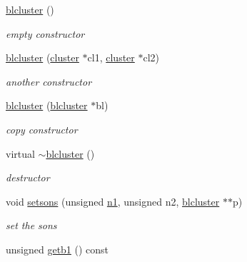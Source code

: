 \begin{DoxyCompactItemize}
\item 
\hypertarget{classblcluster_ac0b8f76057e8ccfdf85ba6f0bcb22365}{
\hyperlink{classblcluster_ac0b8f76057e8ccfdf85ba6f0bcb22365}{blcluster} ()}
\label{classblcluster_ac0b8f76057e8ccfdf85ba6f0bcb22365}

\begin{DoxyCompactList}\small\item\em empty constructor \end{DoxyCompactList}\item 
\hypertarget{classblcluster_a5df550b7bb77a1ac0aae2ac6e83d9fa3}{
\hyperlink{classblcluster_a5df550b7bb77a1ac0aae2ac6e83d9fa3}{blcluster} (\hyperlink{classcluster}{cluster} $\ast$cl1, \hyperlink{classcluster}{cluster} $\ast$cl2)}
\label{classblcluster_a5df550b7bb77a1ac0aae2ac6e83d9fa3}

\begin{DoxyCompactList}\small\item\em another constructor \end{DoxyCompactList}\item 
\hypertarget{classblcluster_abc6f2ee7f3bbb0f9fa41e25ca2fda8d3}{
\hyperlink{classblcluster_abc6f2ee7f3bbb0f9fa41e25ca2fda8d3}{blcluster} (\hyperlink{classblcluster}{blcluster} $\ast$bl)}
\label{classblcluster_abc6f2ee7f3bbb0f9fa41e25ca2fda8d3}

\begin{DoxyCompactList}\small\item\em copy constructor \end{DoxyCompactList}\item 
\hypertarget{classblcluster_a9547f6c9acfbf03afc4096c0698e9bd9}{
virtual \hyperlink{classblcluster_a9547f6c9acfbf03afc4096c0698e9bd9}{$\sim$blcluster} ()}
\label{classblcluster_a9547f6c9acfbf03afc4096c0698e9bd9}

\begin{DoxyCompactList}\small\item\em destructor \end{DoxyCompactList}\item 
\hypertarget{classblcluster_a5fa2afacae44e201697174a6a1ed2f10}{
void \hyperlink{classblcluster_a5fa2afacae44e201697174a6a1ed2f10}{setsons} (unsigned \hyperlink{classblcluster_ac3f85b495bb2fdee9978e20d2748c700}{n1}, unsigned n2, \hyperlink{classblcluster}{blcluster} $\ast$$\ast$p)}
\label{classblcluster_a5fa2afacae44e201697174a6a1ed2f10}

\begin{DoxyCompactList}\small\item\em set the sons \end{DoxyCompactList}\item 
\hypertarget{classblcluster_ab644565da42f5fa1d9310e2a5151760b}{
unsigned \hyperlink{classblcluster_ab644565da42f5fa1d9310e2a5151760b}{getb1} () const }
\label{classblcluster_ab644565da42f5fa1d9310e2a5151760b}


\end{DoxyCompactItemize}
